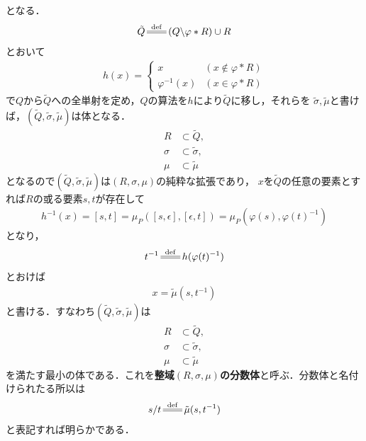 	となる．
	\begin{align}
		\tilde{Q} \defeq (Q \backslash \varphi \ast R) \cup R
	\end{align}
	とおいて
	\begin{align}
		h(x) = 
		\begin{cases}
			x & (x \notin \varphi \ast R) \\
			\varphi^{-1}(x) & (x \in \varphi \ast R)
		\end{cases}
	\end{align}
	で$Q$から$\tilde{Q}$への全単射を定め，$Q$の算法を$h$により$\tilde{Q}$に移し，それらを
	$\tilde{\sigma},\tilde{\mu}$と書けば，$(\tilde{Q},\tilde{\sigma},\tilde{\mu})$は体となる．
	\begin{align}
		R &\subset \tilde{Q}, \\
		\sigma &\subset \tilde{\sigma}, \\
		\mu &\subset \tilde{\mu}
	\end{align}
	となるので$(\tilde{Q},\tilde{\sigma},\tilde{\mu})$は$(R,\sigma,\mu)$の純粋な拡張であり，
	$x$を$\tilde{Q}$の任意の要素とすれば$R$の或る要素$s,t$が存在して
	\begin{align}
		h^{-1}(x) = [s,t] = \mu_P([s,\epsilon],[\epsilon,t]) = \mu_P(\varphi(s),\varphi(t)^{-1})
	\end{align}
	となり，
	\begin{align}
		t^{-1} \defeq h(\varphi(t)^{-1})
	\end{align}
	とおけば
	\begin{align}
		x = \tilde{\mu}(s,t^{-1})
	\end{align}
	と書ける．すなわち$(\tilde{Q},\tilde{\sigma},\tilde{\mu})$は
	\begin{align}
		R &\subset \tilde{Q}, \\
		\sigma &\subset \tilde{\sigma}, \\
		\mu &\subset \tilde{\mu}
	\end{align}
	を満たす最小の体である．これを{\bf 整域$(R,\sigma,\mu)$の分数体}と呼ぶ．分数体と名付けられたる所以は
	\begin{align}
		s/t \defeq \tilde{\mu}(s,t^{-1})
	\end{align}
	と表記すれば明らかである．
